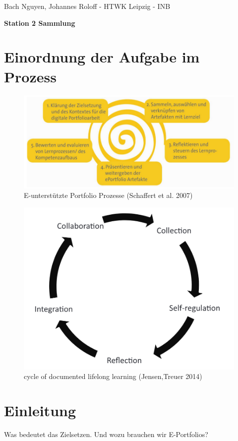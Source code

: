 \documentclass[a4paper,oneside]{scrarticle}
\begin{document}
	\begin{flushleft}
		Bach Nguyen, Johannes Roloff - HTWK Leipzig - INB
	\end{flushleft}
	\begin{center}
		\begin{LARGE}
			\textbf{Station 2 Sammlung}
		\end{LARGE}
	\end{center}
	\section*{Einordnung der Aufgabe im Prozess}
	\begin{figure} [h]
		\centering
		\includegraphics[width=0.7\linewidth]{e-portfolio-prozesse-schaffert}
		\caption{E-unterstützte Portfolio Prozesse (Schaffert et al. 2007)}
		\label{fig:e-portfolio-prozesse-schaffert}
	\end{figure}
	\begin{figure}[h]
		\centering
		\includegraphics[width=0.7\linewidth]{cycle-of-documented-lifelong-learning-Jensen}
		\caption{cycle of documented lifelong learning (Jensen,Treuer 2014)}
		\label{fig:cycle-of-documented-lifelong-learning-jensen}
	\end{figure}
	\pagebreak 
	
	\section*{Einleitung}
	Was bedeutet das Zielsetzen. Und wozu brauchen wir E-Portfolios?
	
\end{document}
